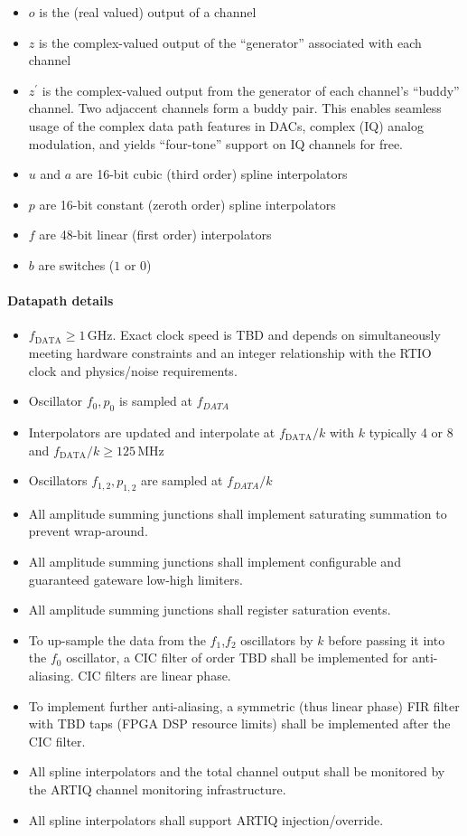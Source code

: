 \documentclass[english]{article}
\begin{document}
\begin{itemize}
	\item $o$ is the (real valued) output of a channel
	\item $z$ is the complex-valued output of the ``generator'' associated with each channel
	\item $z^\prime$ is the complex-valued output from the generator of each channel's ``buddy'' channel.
		Two adjaccent channels form a buddy pair.
		This enables seamless usage of the complex data path features in DACs, complex (IQ) analog modulation, and yields ``four-tone'' support on IQ channels for free.
	\item $u$ and $a$ are 16-bit cubic (third order) spline interpolators
	\item $p$ are 16-bit constant (zeroth order) spline interpolators
	\item $f$ are 48-bit linear (first order) interpolators
	\item $b$ are switches ($1$ or $0$)
\end{itemize}

\paragraph{Datapath details}

\begin{itemize}
	\item $f_\mathrm{DATA}\geq1\,\mathrm{GHz}$. Exact clock speed is TBD and depends on simultaneously meeting hardware constraints and an integer relationship with the RTIO clock and physics/noise requirements.
	\item Oscillator $f_0,p_0$ is sampled at $f_{DATA}$
	\item Interpolators are updated and interpolate at $f_\mathrm{DATA}/k$ with $k$ typically 4 or 8 and $f_\mathrm{DATA}/k \geq 125\,\mathrm{MHz}$
	\item Oscillators $f_{1,2},p_{1,2}$ are sampled at $f_{DATA}/k$
	\item All amplitude summing junctions shall implement saturating summation to prevent wrap-around.
	\item All amplitude summing junctions shall implement configurable and guaranteed gateware low-high limiters.
	\item All amplitude summing junctions shall register saturation events.
	\item To up-sample the data from the $f_1$,$f_2$ oscillators by $k$ before passing it into the $f_0$ oscillator, a CIC filter of order TBD shall be implemented for anti-aliasing. CIC filters are linear phase.
	\item To implement further anti-aliasing, a symmetric (thus linear phase) FIR filter with TBD taps (FPGA DSP resource limits) shall be implemented after the CIC filter.
	\item All spline interpolators and the total channel output shall be monitored by the ARTIQ channel monitoring infrastructure.
	\item All spline interpolators shall support ARTIQ injection/override.
\end{itemize}
\end{document}
